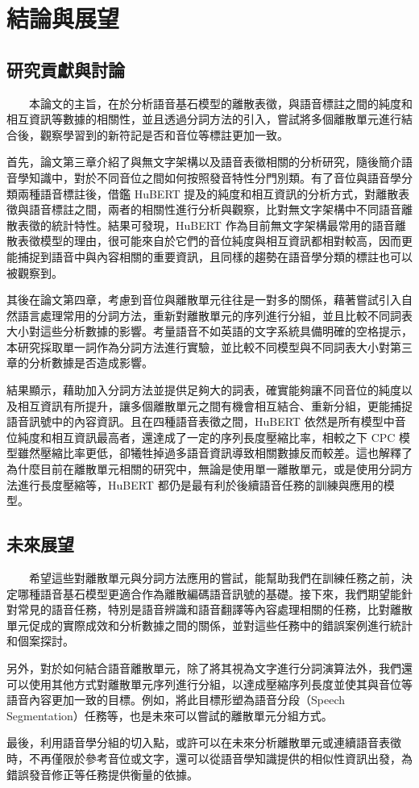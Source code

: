 
\chapter{結論與展望}

\section{研究貢獻與討論}

　　本論文的主旨，在於分析語音基石模型的離散表徵，與語音標註之間的純度和相互資訊等數據的相關性，並且透過分詞方法的引入，嘗試將多個離散單元進行結合後，觀察學習到的新符記是否和音位等標註更加一致。 

        首先，論文第三章介紹了與無文字架構以及語音表徵相關的分析研究，隨後簡介語音學知識中，對於不同音位之間如何按照發音特性分門別類。有了音位與語音學分類兩種語音標註後，借鑑 HuBERT 提及的純度和相互資訊的分析方式，對離散表徵與語音標註之間，兩者的相關性進行分析與觀察，比對無文字架構中不同語音離散表徵的統計特性。結果可發現，HuBERT 作為目前無文字架構最常用的語音離散表徵模型的理由，很可能來自於它們的音位純度與相互資訊都相對較高，因而更能捕捉到語音中與內容相關的重要資訊，且同樣的趨勢在語音學分類的標註也可以被觀察到。

        其後在論文第四章，考慮到音位與離散單元往往是一對多的關係，藉著嘗試引入自然語言處理常用的分詞方法，重新對離散單元的序列進行分組，並且比較不同詞表大小對這些分析數據的影響。考量語音不如英語的文字系統具備明確的空格提示，本研究採取單一詞作為分詞方法進行實驗，並比較不同模型與不同詞表大小對第三章的分析數據是否造成影響。

        結果顯示，藉助加入分詞方法並提供足夠大的詞表，確實能夠讓不同音位的純度以及相互資訊有所提升，讓多個離散單元之間有機會相互結合、重新分組，更能捕捉語音訊號中的內容資訊。且在四種語音表徵之間，HuBERT 依然是所有模型中音位純度和相互資訊最高者，還達成了一定的序列長度壓縮比率，相較之下 CPC 模型雖然壓縮比率更低，卻犧牲掉過多語音資訊導致相關數據反而較差。這也解釋了為什麼目前在離散單元相關的研究中，無論是使用單一離散單元，或是使用分詞方法進行長度壓縮等，HuBERT 都仍是最有利於後續語音任務的訓練與應用的模型。

\section{未來展望}

　　希望這些對離散單元與分詞方法應用的嘗試，能幫助我們在訓練任務之前，決定哪種語音基石模型更適合作為離散編碼語音訊號的基礎。接下來，我們期望能針對常見的語音任務，特別是語音辨識和語音翻譯等內容處理相關的任務，比對離散單元促成的實際成效和分析數據之間的關係，並對這些任務中的錯誤案例進行統計和個案探討。

        另外，對於如何結合語音離散單元，除了將其視為文字進行分詞演算法外，我們還可以使用其他方式對離散單元序列進行分組，以達成壓縮序列長度並使其與音位等語音內容更加一致的目標。例如，將此目標形塑為語音分段（Speech Segmentation）任務等，也是未來可以嘗試的離散單元分組方式。

        最後，利用語音學分組的切入點，或許可以在未來分析離散單元或連續語音表徵時，不再僅限於參考音位或文字，還可以從語音學知識提供的相似性資訊出發，為錯誤發音修正等任務提供衡量的依據。
